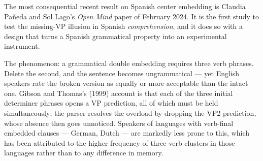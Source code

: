 \documentclass[11pt, a4paper]{article}
\begin{document}
The most consequential recent result on Spanish center embedding is Claudia Pañeda and Sol Lago's \emph{Open Mind} paper of February 2024. It is the first study to test the missing-VP illusion in Spanish \emph{comprehension}, and it does so with a design that turns a Spanish grammatical property into an experimental instrument.

The phenomenon: a grammatical double embedding requires three verb phrases. Delete the second, and the sentence becomes ungrammatical --- yet English speakers rate the broken version as equally or more acceptable than the intact one. Gibson and Thomas's (1999) account is that each of the three initial determiner phrases opens a VP prediction, all of which must be held simultaneously; the parser resolves the overload by dropping the VP2 prediction, whose absence then goes unnoticed. Speakers of languages with verb-final embedded clauses --- German, Dutch --- are markedly less prone to this, which has been attributed to the higher frequency of three-verb clusters in those languages rather than to any difference in memory.
\end{document}
